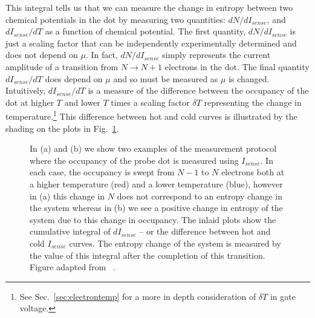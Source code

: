 This integral tells us that we can measure the change in entropy between two chemical potentials in the dot by measuring two quantities: $dN/dI_{sense}$, and $dI_{sense}/dT$ as a function of chemical potential. The first quantity, $dN/dI_{sense}$ is just a scaling factor that can be independently experimentally determined and does not depend on $\mu$. In fact, $dN/dI_{sense}$ simply represents the current amplitude of a transition from $N \to N+1$ electrons in the dot. The final quantity $dI_{sense}/dT$ does depend on $\mu$ and so must be measured as $\mu$ is changed. Intuitively, $dI_{sense}/dT$ is a measure of the difference between the occupancy of the dot at higher $T$ and lower $T$ times a scaling factor $\delta T$ representing the change in temperature.\footnote{See Sec.~\ref{sec:electrontemp} for a more in depth consideration of $\delta T$ in gate voltage.} This difference between hot and cold curves is illustrated by the shading on the plots in Fig.~\ref{fig:num_int}. 
\begin{figure}[h]
\centering
{}
\caption{In (a) and (b) we show two examples of the measurement protocol where the occupancy of the probe dot is measured using $I_{sense}$. In each case, the occupancy is swept from $N - 1$ to $N$ electrons both at a higher temperature (red) and a lower temperature (blue), however in (a) this change in $N$ does not correspond to an entropy change in the system whereas in (b) we see a positive change in entropy of the system due to this change in occupancy. The inlaid plots show the cumulative integral of $d I_{sense}$ -- or the difference between hot and cold $I_{sense}$ curves. The entropy change of the system is measured by the value of this integral after the completion of this transition. Figure adapted from ~\cite{nikentropy}.}
\label{fig:num_int}       %
\end{figure}

